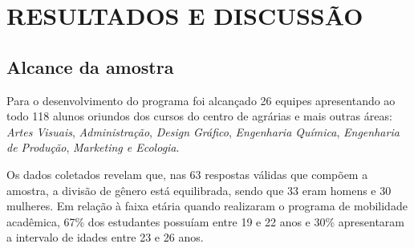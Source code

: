 \chapter{RESULTADOS E DISCUSSÃO }

\section{Alcance da amostra}



Para o desenvolvimento do programa foi alcançado 26 equipes apresentando ao todo 118 alunos oriundos dos cursos do centro de agrárias e mais outras áreas: \textit{Artes Visuais}, \textit{Administração}, \textit{Design Gráfico}, \textit{Engenharia Química}, \textit{Engenharia de Produção}, \textit{Marketing e Ecologia}. 



Os dados coletados revelam que, nas 63 respostas válidas que compõem a amostra, a divisão de gênero está equilibrada, sendo que 33 eram homens e 30 mulheres. Em relação à faixa etária quando realizaram o programa de mobilidade acadêmica, 67\% dos estudantes possuíam entre 19 e 22 anos e 30\% apresentaram a intervalo de idades entre 23 e 26 anos.



